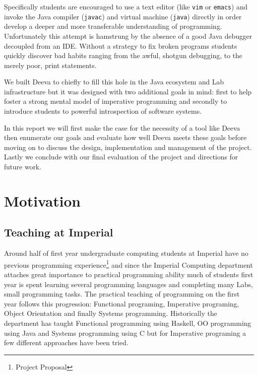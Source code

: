 \documentclass[11pt, a4paper]{article}
\newcommand{\cmd}[1]{{\tt #1}}
\begin{document}
Specifically students are encouraged to use a text editor (like \cmd{vim} or \cmd{emacs}) and invoke the Java compiler (\cmd{javac}) and virtual machine (\cmd{java}) directly in order develop a deeper and more transferable understanding of programming.
Unfortunately this attempt is hamstrung by the absence of a good Java debugger decoupled from an IDE.
Without a strategy to fix broken programs students quickly discover bad habits ranging from the awful, shotgun debugging, to the merely poor, print statements.

We built Deeva to chiefly to fill this hole in the Java ecosystem and Lab infrastructure but it was designed with two additional goals in mind:
first to help foster a strong mental model of imperative programming and secondly to introduce students to powerful introspection of software systems.

In this report we will first make the case for the necessity of a tool like Deeva then enumerate our goals and evaluate how well Deeva meets these goals before moving on to discuss the design, implementation and management of the project. 
Lastly we conclude with our final evaluation of the project and directions for future work.

\clearpage
\tableofcontents
\clearpage

\section{Motivation}
\subsection{Teaching at Imperial}
Around half of first year undergraduate computing students at Imperial have no previous programming experience\footnote{Project Proposal} and since
the Imperial Computing department attaches great importance to practical programming ability much of students first year is spent learning several programming languages and completing many Labs, small programming tasks. 
The practical teaching of programming on the first year follows this progression: Functional programing, Imperative programing, Object Orientation and finally Systems programming.
Historically the department has taught Functional programming using Haskell, OO programming using Java and Systems programming using C but for Imperative programing a few different approaches have been tried.

\end{document}
